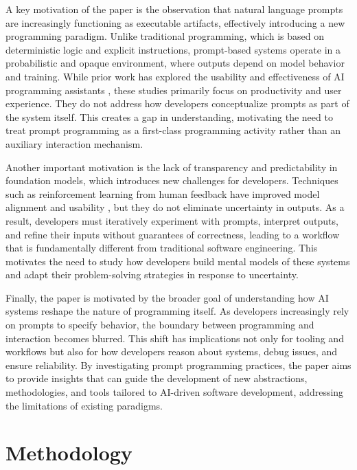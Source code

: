 A key motivation of the paper is the observation that natural language prompts are increasingly functioning as executable artifacts, effectively introducing a new programming paradigm. Unlike traditional programming, which is based on deterministic logic and explicit instructions, prompt-based systems operate in a probabilistic and opaque environment, where outputs depend on model behavior and training. While prior work has explored the usability and effectiveness of AI programming assistants \cite{liang2024survey}, these studies primarily focus on productivity and user experience. They do not address how developers conceptualize prompts as part of the system itself. This creates a gap in understanding, motivating the need to treat prompt programming as a first-class programming activity rather than an auxiliary interaction mechanism.

Another important motivation is the lack of transparency and predictability in foundation models, which introduces new challenges for developers. Techniques such as reinforcement learning from human feedback have improved model alignment and usability \cite{instructgpt}, but they do not eliminate uncertainty in outputs. As a result, developers must iteratively experiment with prompts, interpret outputs, and refine their inputs without guarantees of correctness, leading to a workflow that is fundamentally different from traditional software engineering. This motivates the need to study how developers build mental models of these systems and adapt their problem-solving strategies in response to uncertainty.

Finally, the paper is motivated by the broader goal of understanding how AI systems reshape the nature of programming itself. As developers increasingly rely on prompts to specify behavior, the boundary between programming and interaction becomes blurred. This shift has implications not only for tooling and workflows but also for how developers reason about systems, debug issues, and ensure reliability. By investigating prompt programming practices, the paper aims to provide insights that can guide the development of new abstractions, methodologies, and tools tailored to AI-driven software development, addressing the limitations of existing paradigms.

\section{Methodology}
